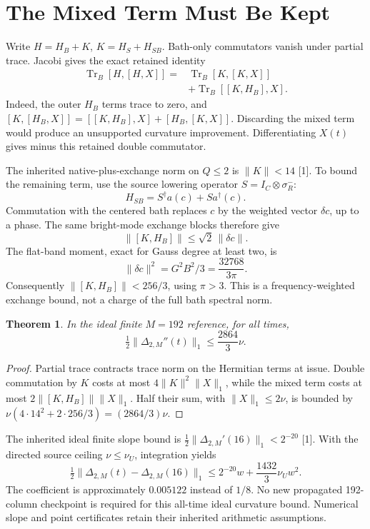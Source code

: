 \documentclass[a4paper,journal]{IEEEtran}
\newtheorem{theorem}{Theorem}
\begin{document}
\section{The Mixed Term Must Be Kept}
Write $H=H_B+K$, $K=H_S+H_{SB}$. Bath-only commutators vanish under partial trace. Jacobi gives the exact retained identity
\begin{align}
 \operatorname{Tr}_B[H,[H,X]]
 ={}&\operatorname{Tr}_B[K,[K,X]]\\
 &+\operatorname{Tr}_B[[K,H_B],X].
\end{align}
Indeed, the outer $H_B$ terms trace to zero, and
$[K,[H_B,X]]=[[K,H_B],X]+[H_B,[K,X]]$.
Discarding the mixed term would produce an unsupported curvature improvement. Differentiating $X(t)$ gives minus this retained double commutator.

The inherited native-plus-exchange norm on $Q\le2$ is $\|K\|<14$ [1]. To bound the remaining term, use the source lowering operator $S=I_C\otimes\sigma_R^-$:
\begin{equation}
 H_{SB}=S^\dagger a(c)+S a^\dagger(c).
\end{equation}
Commutation with the centered bath replaces $c$ by the weighted vector $\delta c$, up to a phase. The same bright-mode exchange blocks therefore give
\begin{equation}
 \|[K,H_B]\|\le\sqrt2\,\|\delta c\|.
\end{equation}
The flat-band moment, exact for Gauss degree at least two, is
\begin{equation}
 \|\delta c\|^2=G^2B^2/3=\frac{32768}{3\pi}.
\end{equation}
Consequently $\|[K,H_B]\|<256/3$, using $\pi>3$. This is a frequency-weighted exchange bound, not a charge of the full bath spectral norm.
\begin{theorem}
In the ideal finite $M=192$ reference, for all times,
\begin{equation}
 \tfrac12\|\Delta_{2,M}''(t)\|_1
 \le\frac{2864}{3}\nu.
\end{equation}
\end{theorem}
\begin{proof}
Partial trace contracts trace norm on the Hermitian terms at issue. Double commutation by $K$ costs at most $4\|K\|^2\|X\|_1$, while the mixed term costs at most $2\|[K,H_B]\|\|X\|_1$. Half their sum, with $\|X\|_1\le2\nu$, is bounded by
$\nu(4\cdot14^2+2\cdot256/3)=(2864/3)\nu$.
\end{proof}

The inherited ideal finite slope bound is $\tfrac12\|\Delta_{2,M}'(16)\|_1<2^{-20}$ [1]. With the directed source ceiling $\nu\le\nu_U$, integration yields
\begin{equation}
 \tfrac12\|\Delta_{2,M}(t)-\Delta_{2,M}(16)\|_1
 \le2^{-20}w+\frac{1432}{3}\nu_U w^2.
\end{equation}
The coefficient is approximately $0.005122$ instead of $1/8$. No new propagated 192-column checkpoint is required for this all-time ideal curvature bound. Numerical slope and point certificates retain their inherited arithmetic assumptions.
\end{document}
